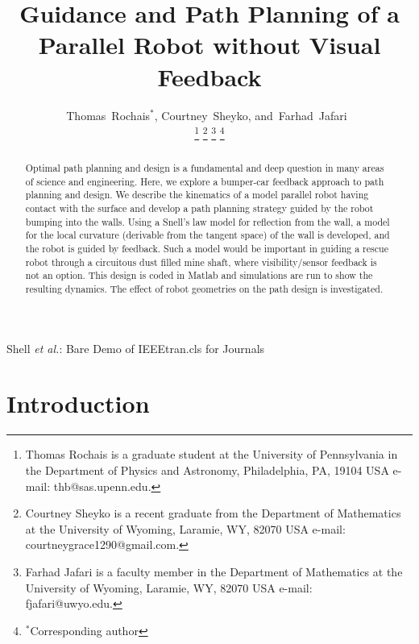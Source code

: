 \documentclass[journal]{IEEEtran}
\begin{document}
\title{Guidance and Path Planning of a Parallel Robot without Visual Feedback}

\author{Thomas~Rochais$^*$,
        Courtney~Sheyko,
        and~Farhad~Jafari~%

\thanks{Thomas Rochais is a graduate student at the University of Pennsylvania in the Department of Physics and Astronomy, Philadelphia, PA, 19104 USA e-mail: thb@sas.upenn.edu.}%
\thanks{Courtney Sheyko is a recent graduate from the Department
of Mathematics at the University of Wyoming, Laramie,
WY, 82070 USA e-mail: courtneygrace1290@gmail.com.}%
\thanks{Farhad Jafari is a faculty member in the Department
of Mathematics at the University of Wyoming, Laramie,
WY, 82070 USA e-mail: fjafari@uwyo.edu.}
\thanks{$^*$Corresponding author}}


%
{Shell \MakeLowercase{\textit{et al.}}: Bare Demo of IEEEtran.cls for Journals}

\maketitle

\begin{abstract}
Optimal path planning and design is a fundamental and deep question in many areas of science and engineering. Here, we explore a bumper-car feedback approach to path planning and design. We describe the kinematics of a model parallel robot having contact with the surface and develop a path planning strategy guided by the robot bumping into the walls. Using a Snell's law model for reflection from the wall, a model for the local curvature (derivable from the tangent space) of the wall is developed, and the robot is guided by feedback. Such a model would be important in guiding a rescue robot through a circuitous dust filled mine shaft, where visibility/sensor feedback is not an option. This design is coded in Matlab and simulations are run to show the resulting dynamics. The effect of robot geometries on the path design is investigated.
\end{abstract}

\section{Introduction}
\end{document}
